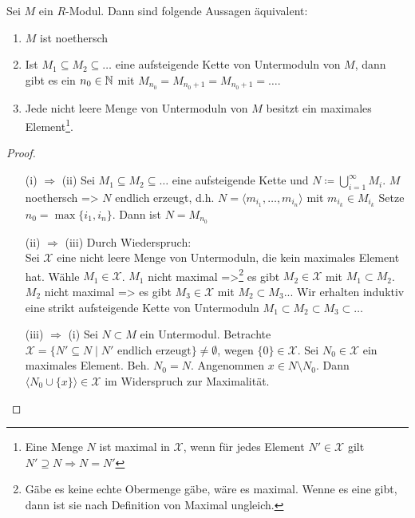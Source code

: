 \documentclass[../main.tex]{subfiles}
\begin{document}
\begin{theorem}
    Sei $M$ ein $R$-Modul. Dann sind folgende Aussagen äquivalent:
    \begin{enumerate}[label=(\roman*)]
        \item $M$ ist noethersch
        \item Ist $M_1\subseteq M_2\subseteq \dots$ eine aufsteigende Kette von Untermoduln von $M$, dann gibt es ein $n_0\in \mathbb{N}$ mit $M_{n_0} = M_{n_0+1} = M_{n_0+1}=\dots$.
        \item Jede nicht leere Menge von Untermoduln von $M$ besitzt ein maximales Element\footnote{Eine Menge $N$ ist maximal in $\mathcal{X}$, wenn für jedes Element $N'\in \mathcal{X}$ gilt $N'\supseteq N \Rightarrow N = N'$}.
    \end{enumerate}
\end{theorem}
\begin{proof} $ $
    \begin{itemize}
        \item[(i) $\Rightarrow$ (ii)]
        Sei $M_1\subseteq M_2\subseteq \dots$ eine aufsteigende Kette und $N\coloneqq \bigcup_{i=1}^\infty M_i$.
        $M$ noethersch => $N$ endlich erzeugt, d.h. $N=\langle m_{i_1},\dots, m_{i_n}\rangle$ mit $m_{i_k} \in M_{i_k}$
        Setze $n_0 = \max\{i_1,i_n\}$.
        Dann ist $N=M_{n_0}$
        \item[(ii) $\Rightarrow$ (iii)]
        Durch Wiederspruch:\\
        Sei $\mathcal{X}$ eine nicht leere Menge von Untermoduln, die kein maximales Element hat.
        Wähle $M_1\in \mathcal{X}$. $M_1$ nicht maximal
        =>\footnote{Gäbe es keine echte Obermenge gäbe, wäre es maximal. Wenne es eine gibt, dann ist sie nach Definition von Maximal ungleich.} es gibt $M_2\in \mathcal{X}$ mit $M_1\subset M_2$.
        $M_2$ nicht maximal => es gibt $M_3\in \mathcal{X}$ mit $M_2\subset M_3$...
        Wir erhalten induktiv eine strikt aufsteigende Kette von Untermoduln $M_1\subset M_2\subset M_3\subset \dots$ \Lightning
        \item[(iii) $\Rightarrow$ (i)] Sei $N\subset M$ ein Untermodul.
        Betrachte $\mathcal{X}=\{N'\subseteq N\mid N' \text{ endlich erzeugt}\} \neq\emptyset$, wegen $\{0\}\in \mathcal{X}$.
        Sei $N_0\in \mathcal{X}$ ein maximales Element.
        Beh. $N_0 = N$. Angenommen $x\in N\setminus N_0$.
        Dann $\langle N_0\cup \{x\}\rangle\in \mathcal{X}$ im Widerspruch zur Maximalität.
    \end{itemize}
\end{proof}
\end{document}

